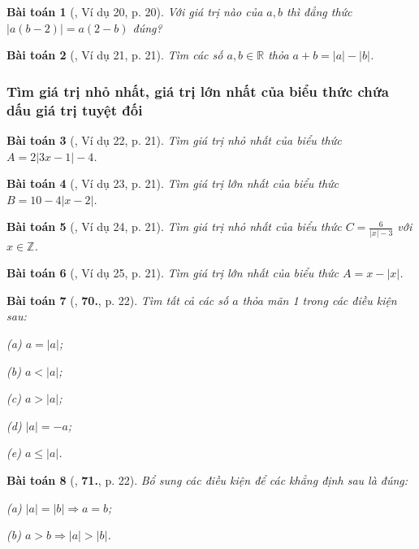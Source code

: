 \documentclass{article}
\numberwithin{equation}{section}
\newtheorem{baitoan}{Bài toán}
\begin{document}
\begin{baitoan}[\cite{Binh_Toan_7_tap_1}, Ví dụ 20, p. 20]
	Với giá trị nào của $a,b$ thì đẳng thức $|a(b - 2)| = a(2 - b)$ đúng?
\end{baitoan}

\begin{baitoan}[\cite{Binh_Toan_7_tap_1}, Ví dụ 21, p. 21]
	Tìm các số $a,b\in\mathbb{R}$ thỏa $a + b = |a| - |b|$.
\end{baitoan}

\subsubsection{Tìm giá trị nhỏ nhất, giá trị lớn nhất của biểu thức chứa dấu giá trị tuyệt đối}

\begin{baitoan}[\cite{Binh_Toan_7_tap_1}, Ví dụ 22, p. 21]
	Tìm giá trị nhỏ nhất của biểu thức $A = 2|3x - 1| - 4$.
\end{baitoan}

\begin{baitoan}[\cite{Binh_Toan_7_tap_1}, Ví dụ 23, p. 21]
	Tìm giá trị lớn nhất của biểu thức $B = 10 - 4|x - 2|$.
\end{baitoan}

\begin{baitoan}[\cite{Binh_Toan_7_tap_1}, Ví dụ 24, p. 21]
	Tìm giá trị nhỏ nhất của biểu thức $C = \frac{6}{|x| - 3}$ với $x\in\mathbb{Z}$.
\end{baitoan}

\begin{baitoan}[\cite{Binh_Toan_7_tap_1}, Ví dụ 25, p. 21]
	Tìm giá trị lớn nhất của biểu thức $A = x - |x|$.
\end{baitoan}

\begin{baitoan}[\cite{Binh_Toan_7_tap_1}, \textbf{70.}, p. 22]
	Tìm tất cả các số $a$ thỏa mãn 1 trong các điều kiện sau:
	\begin{enumerate*}
		\item[(a)] $a = |a|$;
		\item[(b)] $a < |a|$;
		\item[(c)] $a > |a|$;
		\item[(d)] $|a| = -a$;
		\item[(e)] $a\le|a|$.
	\end{enumerate*}
\end{baitoan}

\begin{baitoan}[\cite{Binh_Toan_7_tap_1}, \textbf{71.}, p. 22]
	Bổ sung các điều kiện để các khẳng định sau là đúng:
	\begin{enumerate*}
		\item[(a)] $|a| = |b|\Rightarrow a = b$;
		\item[(b)] $a > b\Rightarrow|a| > |b|$.
	\end{enumerate*}
\end{baitoan}
\end{document}
